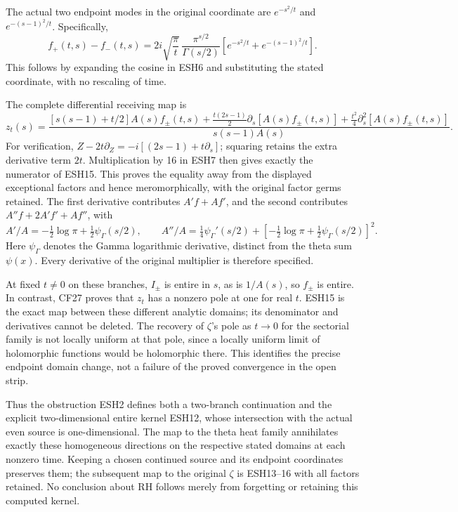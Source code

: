 The actual two endpoint modes in the original coordinate are
\(e^{-s^2/t}\) and \(e^{-(s-1)^2/t}\). Specifically,
\[
 f_+(t,s)-f_-(t,s)
  =2i\sqrt{\frac\pi t}\,
       \frac{\pi^{s/2}}{\Gamma(s/2)}
          \left[e^{-s^2/t}+e^{-(s-1)^2/t}\right].          \tag{ESH14}
\]
This follows by expanding the cosine in ESH6 and substituting
the stated coordinate, with no rescaling of time.

The complete differential receiving map is
\[
 z_t(s)=\frac{
  [s(s-1)+t/2]A(s)f_\pm(t,s)
   +\frac{t(2s-1)}2\partial_s[A(s)f_\pm(t,s)]
   +\frac{t^2}4\partial_s^2[A(s)f_\pm(t,s)]
 }{s(s-1)A(s)}.                                         \tag{ESH15}
\]
For verification, \(Z-2t\partial_Z=-i[(2s-1)+t\partial_s]\);
squaring retains the extra derivative term \(2t\).
Multiplication by 16 in ESH7 then gives exactly the numerator
of ESH15. This proves the equality away from the displayed
exceptional factors and hence meromorphically, with the original
factor germs retained. The first derivative contributes
\(A'f+Af'\), and the second contributes
\(A''f+2A'f'+Af''\), with
\[
 A'/A=-\tfrac12\log\pi+\tfrac12\psi_{\Gamma}(s/2),\qquad
 A''/A=\tfrac14\psi_{\Gamma}'(s/2)
       +[-\tfrac12\log\pi+\tfrac12\psi_{\Gamma}(s/2)]^2.
                                                               \tag{ESH16}
\]
Here \(\psi_{\Gamma}\) denotes the Gamma logarithmic derivative,
distinct from the theta sum \(\psi(x)\). Every derivative of
the original multiplier is therefore specified.

At fixed \(t\ne0\) on these branches, \(I_\pm\) is entire
in \(s\), as is \(1/A(s)\), so \(f_\pm\) is entire. In
contrast, CF27 proves that \(z_t\) has a nonzero pole at one
for real \(t\). ESH15 is the exact map between these different
analytic domains; its denominator and derivatives cannot be
deleted. The recovery of \(\zeta\)'s pole as \(t\to0\) for
the sectorial family is not locally uniform at that pole, since
a locally uniform limit of holomorphic functions would be
holomorphic there. This identifies the precise endpoint domain
change, not a failure of the proved convergence in the open strip.

Thus the obstruction ESH2 defines both a two-branch continuation
and the explicit two-dimensional entire kernel ESH12, whose
intersection with the actual even source is one-dimensional.
The map to the theta heat family annihilates exactly these
homogeneous directions on the respective stated domains at each
nonzero time. Keeping a chosen continued
source and its endpoint coordinates preserves them; the
subsequent map to the original \(\zeta\) is ESH13--16 with
all factors retained. No conclusion about RH follows merely
from forgetting or retaining this computed kernel.
